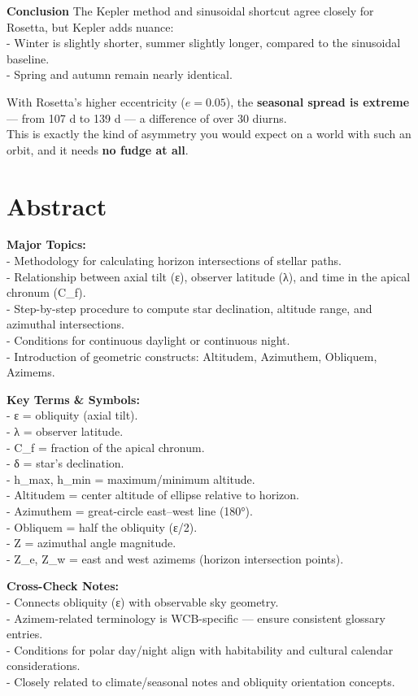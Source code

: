 \documentclass[
  letterpaper,
]{book}
\begin{document}
\textbf{Conclusion} The Kepler method and sinusoidal shortcut agree
closely for Rosetta, but Kepler adds nuance:\\
- Winter is slightly shorter, summer slightly longer, compared to the
sinusoidal baseline.\\
- Spring and autumn remain nearly identical.

With Rosetta's higher eccentricity (\(e = 0.05\)), the \textbf{seasonal
spread is extreme} --- from 107 d to 139 d --- a difference of over 30
diurns.\\
This is exactly the kind of asymmetry you would expect on a world with
such an orbit, and it needs \textbf{no fudge at all}.

\section{Abstract}\label{abstract-29}

\textbf{Major Topics:}\\
- Methodology for calculating horizon intersections of stellar paths.\\
- Relationship between axial tilt (ε), observer latitude (λ), and time
in the apical chronum (C\_f).\\
- Step-by-step procedure to compute star declination, altitude range,
and azimuthal intersections.\\
- Conditions for continuous daylight or continuous night.\\
- Introduction of geometric constructs: Altitudem, Azimuthem, Obliquem,
Azimems.

\textbf{Key Terms \& Symbols:}\\
- ε = obliquity (axial tilt).\\
- λ = observer latitude.\\
- C\_f = fraction of the apical chronum.\\
- δ = star's declination.\\
- h\_max, h\_min = maximum/minimum altitude.\\
- Altitudem = center altitude of ellipse relative to horizon.\\
- Azimuthem = great-circle east--west line (180°).\\
- Obliquem = half the obliquity (ε/2).\\
- Z = azimuthal angle magnitude.\\
- Z\_e, Z\_w = east and west azimems (horizon intersection points).

\textbf{Cross-Check Notes:}\\
- Connects obliquity (ε) with observable sky geometry.\\
- Azimem-related terminology is WCB-specific --- ensure consistent
glossary entries.\\
- Conditions for polar day/night align with habitability and cultural
calendar considerations.\\
- Closely related to climate/seasonal notes and obliquity orientation
concepts.
\end{document}
